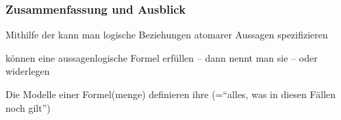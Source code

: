 \documentclass[onlymath]{beamer}
\begin{document}
\begin{frame}\frametitle{Zusammenfassung und Ausblick}

Mithilfe der  kann man logische Beziehungen atomarer Aussagen spezifizieren
\bigskip

 können eine aussagenlogische Formel erfüllen -- dann nennt man sie  -- oder widerlegen
\bigskip

Die Modelle einer Formel(menge) definieren ihre 
(="`alles, was in diesen Fällen noch gilt"')\bigskip


\end{frame}
\end{document}

